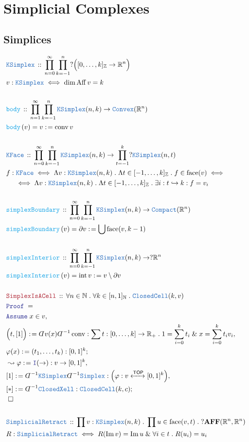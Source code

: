 \documentclass[12pt]{scrartcl}
\newcommand{\TYPE}[1]{\textcolor{NavyBlue}{\mathtt{#1}}}
\newcommand{\FUNC}[1]{\textcolor{Cerulean}{\mathtt{#1}}}
\newcommand{\LOGIC}[1]{\textcolor{Blue}{\mathtt{#1}}}
\newcommand{\THM}[1]{\textcolor{Maroon}{\mathtt{#1}}}
\renewcommand{\.}{\; . \;}
\newcommand{\de}{: \kern 0.1pc =}
\newcommand{\Act}[1]{\left( #1 \right)}
\newcommand{\Theorem}[2]{& \THM{#1} \, :: \, #2 \\ & \Proof = \\ }
\newcommand{\DeclareType}[2]{& \TYPE{#1} \, :: \, #2 \\}
\newcommand{\DefineType}[3]{& #1 : \TYPE{#2} \iff #3 \\}
\newcommand{\DefineNamedType}[4]{& #1 : \TYPE{#2} \iff #3 \iff #4 \\}
\newcommand{\DeclareFunc}[2]{& \FUNC{#1} \, :: \, #2 \\}
\newcommand{\DefineNamedFunc}[4]{&  \FUNC{#1}\Act{#2} = #3 \de #4 \\}
\newcommand{\NewLine}{\\ & \kern 1pc}
\newcommand{\Page}[1]{ \begin{align*} #1 \end{align*}   }
\newcommand{ \bd }{ \ByDef }
\renewcommand{\And}{\; \& \;}
\newcommand{\Intro}{\LOGIC{I}}
\newcommand{\Int}{\mathbb{Z} }
\newcommand{\Reals}{\mathbb{R} }
\newcommand{\Nat}{\mathbb{N} }
\DeclareMathOperator*{\im}{Im}
\newcommand{\ToInj}{\hookrightarrow}
\newcommand{\ToIso}{\xleftrightarrow}
\newcommand{\Say}[3]{& #1 \de #2 : #3, \\}
\newcommand{\Conclude}[3]{& #1 \de #2 : #3; \\}
\newcommand{\Derive}[3]{& \leadsto #1 \de #2 : #3, \\}
\newcommand{\AssumeIn}[2]{& \LOGIC{Assume} \; #1 \in #2, \\}
\newcommand{\QED}{\; \square}
\newcommand{\EndProof}{& \QED \\}
\newcommand{\ByDef}{\rotatebox[origin=c]{-180}{$D$}}%
\newcommand{\Proof}{\LOGIC{Proof} \; }
\DeclareMathOperator*{\intx}{int}
\newcommand{\TOP}{\mathsf{TOP}}
\newcommand{\AFF}{\mathbf{AFF}}
\DeclareMathOperator{\Aff}{Aff}
\newcommand{\Convex}{\TYPE{Convex}}
\DeclareMathOperator{\conv}{conv}
\begin{document}
\section{Simplicial Complexes}
\subsection{Simplices}
\Page{
	\DeclareType{KSimplex}{\prod^\infty_{n=0} \prod^n_{k=-1} ?\Big([0, \ldots, k]_\Int \to \Reals^n\Big)}
	\DefineType{v}{KSimplex}{\dim \Aff v = k}
	\\
	\DeclareFunc{body}{\prod^\infty_{n=1} \prod^n_{k=-1} \TYPE{KSimplex}(n,k) \to \Convex(\Reals^n)}
	\DefineNamedFunc{body}{v}{v}{\conv v}
	\\
	\DeclareType{KFace}{\prod^\infty_{n=0} \prod^n_{k=-1} \TYPE{KSimplex}(n,k) \to  \prod^k_{t=-1} ?\TYPE{KSimplex}(n,t) }
	\DefineNamedType {f}{KFace}{\Lambda v : \TYPE{KSimplex}(n,k) \. \Lambda t \in [-1,\ldots,k]_\Int \. f \in \mathrm{face}(v) }
	{
		\NewLine \iff
		\Lambda v : \TYPE{KSimplex}(n,k) \.\Lambda t \in [-1,\ldots,k]_\Int \. \exists i : t \ToInj k : f = v_i 
	}
	\\
	\DeclareFunc{simplexBoundary}{\prod^\infty_{n=0} \prod^n_{k=-1} \TYPE{KSimplex}(n,k) \to \TYPE{Compact}(\Reals^n) }
	\DefineNamedFunc{simplexBoundary}{v}{\partial v}{\bigcup \mathrm{face}(v,k-1)}
	\\
	\DeclareFunc{simplexInterior}{\prod^\infty_{n=0} \prod^n_{k=-1} \TYPE{KSimplex}(n,k) \to ?\Reals^n}
	\DefineNamedFunc{simplexInterior}{v}{\intx v}{v \setminus \partial v}
	\\
	\Theorem{SimplexIsACell}{\forall n \in \Nat \. \forall k \in [n,1]_{\Nat} \.  \TYPE{ClosedCell}(k,v)   }
	\AssumeIn{x}{v}
	\Say{\Big(t,[1]\Big)}{\bd v (x)\bd^{-1}\conv}
	{\sum t : [0,\ldots,k] \to \Reals_+ \. 1 = \sum^k_{i=0} t_i \And x = \sum^k_{i=0} t_i v_i}
	\Conclude{\varphi(x)}{(t_1,\ldots,t_k)}{[0,1]^k}
	\Derive{\varphi}{\Intro(\to)}{ v \to [0,1]^k}
	\Say{[1]}{\bd^{-1}\TYPE{KSimplex}\bd^{-1}\TYPE{Simplex}}{\Big(\varphi : v \ToIso{\TOP} [0,1]^k\Big) }
	\Conclude{[*]}{\bd^{-1}\TYPE{ClosedXell}}{\TYPE{ClosedCell}(k,c)}
	\EndProof
	\\
	\DeclareType{SimplicialRetract}
	{
		\prod v : \TYPE{KSimplex}(n,k) \.
		\prod u \in \mathrm{face}(v,t) \.
		?\AFF(\Reals^n,\Reals^n)
	}
	\DefineType{R}{SimplicialRetract}{R(\im v) = \im u \And \forall i \in t \. R(u_i) = u_i}
}
\end{document}
